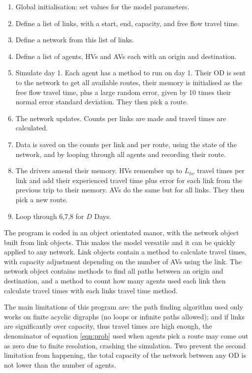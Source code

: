 \documentclass[12pt, a4paper, onecolumn]{article}
\begin{document}
\begin{enumerate}
	\item Global initialisation: set values for the model parameters.
	\item Define a list of links, with a start, end, capacity, and free flow travel time.
	\item Define a network from this list of links. 
	\item Define a list of agents, HVs and AVs each with an origin and destination.
	\item Simulate day 1. Each agent has a method to run on day 1. Their OD is sent to the network to get all available routes, their memory is initialised as the free flow travel time, plus a large random error, given by 10 times their normal error standard deviation. They then pick a route.
	\item The network updates. Counts per links are made and travel times are calculated.
	\item Data is saved on the counts per link and per route, using the state of the network, and by looping through all agents and recording their route.
	\item The drivers amend their memory. HVs remember up to $L_{hv}$ travel times per link and add their experienced travel time plus error for each link from the previous trip to their memory. AVs do the same but for all links. They then pick a new route.
	\item Loop through 6,7,8 for $D$ Days.
	\end{enumerate}

The program is coded in an object orientated manor, with the network object built from link objects. This makes the model versatile and it can be quickly applied to any network. Link objects contain a method to calculate travel times, with capacity adjustment depending on the number of AVs using the link. The network object contains methods to find all paths between an origin and destination, and a method to count how many agents used each link then calculate travel times with each links travel time method.

The main limitations of this program are: the path finding algorithm used only works on finite acyclic digraphs (no loops or infinite paths allowed); and if links are significantly over capacity, thus travel times are high enough, the denominator of equation \ref{eqn:prob} used when agents pick a route may come out as zero due to finite resolution, crashing the simulation. Two prevent the second limitation from happening, the total capacity of the network between any OD is not lower than the number of agents.
\end{document}
